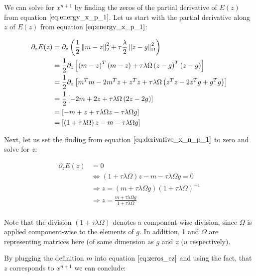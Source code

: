 We can solve for $x^{n+1}$ by finding the zeros of the partial derivative of $E(z)$ from equation $\ref{eq:energy_x_p_1}$. Let us start with the partial derivative along $z$ of $E(z)$ from equation $\ref{eq:energy_x_p_1}$: 

\begin{align}
	\partial_{z} E(z)
	&= \partial_{z} \left( \frac{1}{2} \left\lVert m - z\right\rVert_2^2 + \tau \frac{\lambda}{2}\left\lVert z - g\right\rVert_{\Omega}^2 \right) \nonumber \\
	&= \frac{1}{2} \partial_{z} \left[ \left( m - z \right)^{T}\left( m - z \right) + \tau \lambda \Omega \left( z -g \right)^{T}\left( z -g \right) \right] \nonumber \\
	&= \frac{1}{2} \partial_{z} \left[ m^{T}m -2m^{T} z + z^{T} z + \tau \lambda \Omega \left( z^{T}z -2z^{T} g + g^{T} g\right) \right] \nonumber \\
	&= \frac{1}{2} \left[ -2m + 2z + \tau \lambda \Omega \left( 2 z -2g \right) \right] \nonumber \\
	&= \left[ -m + z + \tau \lambda \Omega z - \tau \lambda \Omega g \right]	 \nonumber \\	
	&= \left[ \left(1+\tau \lambda \Omega \right)z-m - \tau \lambda \Omega g \right]	 \nonumber \\
\label{eq:derivative_x_n_p_1}		
\end{align}

Next, let us set the finding from equation $\ref{eq:derivative_x_n_p_1}$ to zero and solve for $z$:

\begin{align}
	\partial_{z} E(z) 
	&= 0 \nonumber \\
	&\Leftrightarrow \left(1+\tau \lambda \Omega \right)z-m - \tau \lambda \Omega g = 0 \nonumber \\
	&\Rightarrow z = \left(m +  \tau \lambda \Omega g \right) \left( 1+\tau \lambda \Omega\right)^{-1} \nonumber \\
	&\Rightarrow z = \frac{m +  \tau \lambda \Omega g}{1+\tau \lambda \Omega} \nonumber \\
\label{eq:zeros_ez}	
\end{align}

Note that the division $(1+\tau \lambda \Omega)$ denotes a component-wise division, since $\Omega$ is applied component-wise to the elements of $g$. In addition, 1 and $\Omega$ are representing matrices here (of same dimension as $g$ and $z$ ($u$ respectively).

By plugging the definition $m$ into equation $\ref{eq:zeros_ez}$ and using the fact, that $z$ corresponds to $x^{n+1}$ we can conclude:

